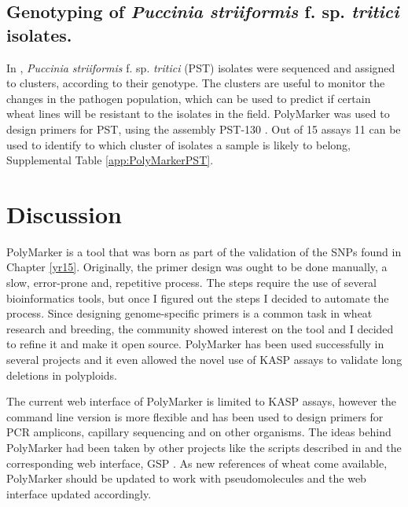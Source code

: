 \subsection{Genotyping of \textit{Puccinia 
striiformis} f. sp. \textit{tritici} isolates.}
In \cite{Hubbard2015}, \textit{Puccinia striiformis} f. sp. \textit{tritici} (PST) isolates were sequenced and assigned to clusters, according to their genotype.
The clusters are useful to monitor the changes in the pathogen population, which can be used to predict if certain wheat lines will be resistant to the isolates in the field. 
PolyMarker was used to design primers for PST, using the assembly PST-130 \citep{Cantu2011}.
Out of 15 assays 11 can be used to identify to which cluster of isolates a sample is likely to belong, Supplemental Table \ref{app:PolyMarkerPST}.


\section{Discussion}

PolyMarker is a tool that was born as part of the validation of the SNPs found in Chapter \ref{yr15}. 
Originally, the primer design was ought to be done manually, a slow, error-prone and, repetitive process. 
The steps require the use of several bioinformatics tools, but once I figured out the steps I decided to automate the process. 
Since designing genome-specific primers is a common task in wheat research and breeding, the community showed interest on the tool and I decided to refine it and make it open source. 
PolyMarker has been used successfully in several projects and it even allowed the novel use of KASP assays to validate long deletions in polyploids. 

The current web interface of PolyMarker is limited to KASP assays, however the command line version is more flexible and has been used to design primers for PCR amplicons, capillary sequencing and on other organisms. 
The ideas behind PolyMarker had been taken by other projects like the scripts described in \cite{Ma2015} and the corresponding web interface, GSP \citep{Wang2016}. 
As new references of wheat come available, PolyMarker should be updated to work with pseudomolecules and the web interface updated accordingly.  


 


